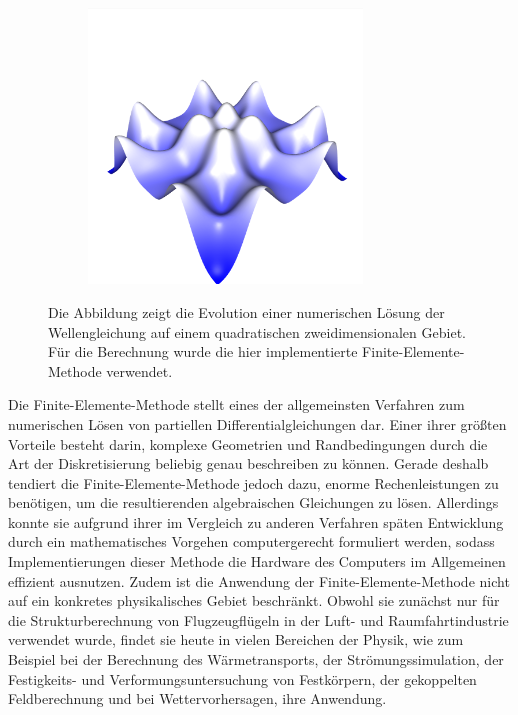 \documentclass[crop=false]{standalone}
\begin{document}
\begin{figure}[h]
\begin{subfigure}[b]{0.32\textwidth}
        \center
        \includegraphics[trim={0 0 0 2.2cm}, clip, width=0.8\textwidth]{images/intro_06.png}
        \caption{}
      \end{subfigure}
      \caption[%
        Einfache Simulation der Wellengleichung%
      ]{%
        Die Abbildung zeigt die Evolution einer numerischen Lösung der Wellengleichung auf einem quadratischen zweidimensionalen Gebiet.
        Für die Berechnung wurde die hier implementierte Finite-Elemente-Methode verwendet.%
      }
      \label{fig:intro}
    \end{figure}

    Die Finite-Elemente-Methode stellt eines der allgemeinsten Verfahren zum numerischen Lösen von partiellen Differentialgleichungen dar.
    Einer ihrer größten Vorteile besteht darin, komplexe Geometrien und Randbedingungen durch die Art der Diskretisierung beliebig genau beschreiben zu können.
    Gerade deshalb tendiert die Finite-Elemente-Methode jedoch dazu, enorme Rechenleistungen zu benötigen, um die resultierenden algebraischen Gleichungen zu lösen.
    Allerdings konnte sie aufgrund ihrer im Vergleich zu anderen Verfahren späten Entwicklung durch ein mathematisches Vorgehen computergerecht formuliert werden, sodass Implementierungen dieser Methode die Hardware des Computers im Allgemeinen effizient ausnutzen.
    Zudem ist die Anwendung der Finite-Elemente-Methode nicht auf ein konkretes physikalisches Gebiet beschränkt.
    Obwohl sie zunächst nur für die Strukturberechnung von Flugzeugflügeln in der Luft- und Raumfahrtindustrie verwendet wurde, findet sie heute in vielen Bereichen der Physik, wie zum Beispiel bei der Berechnung des Wärmetransports, der Strömungssimulation, der Festigkeits- und Verformungsuntersuchung von Festkörpern, der gekoppelten Feldberechnung und bei Wettervorhersagen, ihre Anwendung.
    \cite{Logan2007,Cheney2008,Quarteroni2000}
\end{document}
